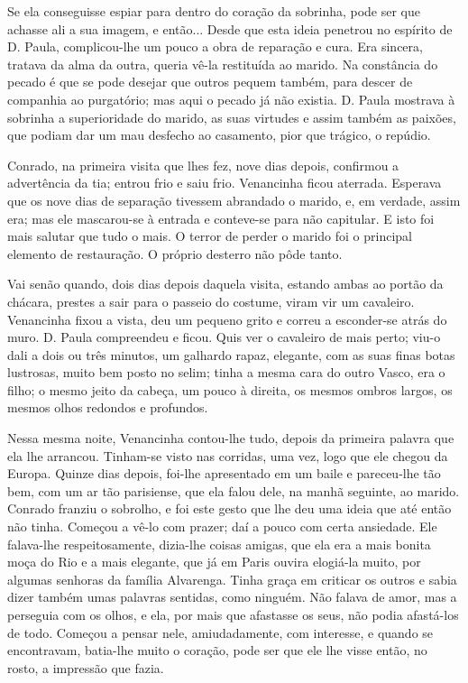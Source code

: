 Se ela conseguisse espiar para dentro do coração da sobrinha, pode ser
que achasse ali a sua imagem, e então... Desde que esta ideia penetrou
no espírito de D. Paula, complicou-lhe um pouco a obra de reparação e
cura. Era sincera, tratava da alma da outra, queria vê-la restituída ao
marido. Na constância do pecado é que se pode desejar que outros pequem
também, para descer de companhia ao purgatório; mas aqui o pecado já não
existia. D. Paula mostrava à sobrinha a superioridade do marido, as suas
virtudes e assim também as paixões, que podiam dar um mau desfecho ao
casamento, pior que trágico, o repúdio.

Conrado, na primeira visita que lhes fez, nove dias depois, confirmou a
advertência da tia; entrou frio e saiu frio. Venancinha ficou aterrada.
Esperava que os nove dias de separação tivessem abrandado o marido, e,
em verdade, assim era; mas ele mascarou-se à entrada e conteve-se para
não capitular. E isto foi mais salutar que tudo o mais. O terror de
perder o marido foi o principal elemento de restauração. O próprio
desterro não pôde tanto.

Vai senão quando, dois dias depois daquela visita, estando ambas ao
portão da chácara, prestes a sair para o passeio do costume, viram vir
um cavaleiro. Venancinha fixou a vista, deu um pequeno grito e correu a
esconder-se atrás do muro. D. Paula compreendeu e ficou. Quis ver o
cavaleiro de mais perto; viu-o dali a dois ou três minutos, um galhardo
rapaz, elegante, com as suas finas botas lustrosas, muito bem posto no
selim; tinha a mesma cara do outro Vasco, era o filho; o mesmo jeito da
cabeça, um pouco à direita, os mesmos ombros largos, os mesmos olhos
redondos e profundos.

Nessa mesma noite, Venancinha contou-lhe tudo, depois da primeira
palavra que ela lhe arrancou. Tinham-se visto nas corridas, uma vez,
logo que ele chegou da Europa. Quinze dias depois, foi-lhe apresentado
em um baile e pareceu-lhe tão bem, com um ar tão parisiense, que ela
falou dele, na manhã seguinte, ao marido. Conrado franziu o sobrolho, e
foi este gesto que lhe deu uma ideia que até então não tinha. Começou a
vê-lo com prazer; daí a pouco com certa ansiedade. Ele falava-lhe
respeitosamente, dizia-lhe coisas amigas, que ela era a mais bonita moça
do Rio e a mais elegante, que já em Paris ouvira elogiá-la muito, por
algumas senhoras da família Alvarenga. Tinha graça em criticar os outros
e sabia dizer também umas palavras sentidas, como ninguém. Não falava de
amor, mas a perseguia com os olhos, e ela, por mais que afastasse os
seus, não podia afastá-los de todo. Começou a pensar nele,
amiudadamente, com interesse, e quando se encontravam, batia-lhe muito o
coração, pode ser que ele lhe visse então, no rosto, a impressão que
fazia.


